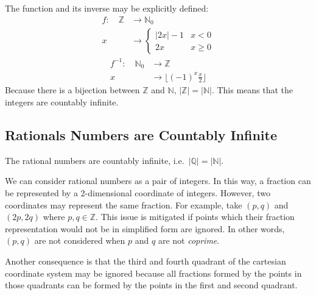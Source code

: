 The function and its inverse may be explicitly defined:
\begin{align*}
    f:\quad\mathbb{Z}&\longrightarrow\mathbb{N}_0 \\
                    x&\longrightarrow\begin{cases}
                        |2x|-1 & x<0 \\ 2x & x\ge0
                    \end{cases}
\end{align*}
\begin{align*}
    f^{-1}:\quad\mathbb{N}_0&\longrightarrow\mathbb{Z} \\
                           x&\longrightarrow\lfloor(-1)^{x}\frac{x}{2}\rfloor
\end{align*}
Because there is a bijection between \(\mathbb{Z}\) and \(\mathbb{N}\), \(|\mathbb{Z}|=|\mathbb{N}|\).
This means that the integers are countably infinite. 

\subsection{Rationals Numbers are Countably Infinite}

\begin{proposition}
    The rational numbers are countably infinite, i.e.\ \(|\mathbb{Q}|=|\mathbb{N}|\).
\end{proposition}

We can consider rational numbers as a pair of integers. In this way, a fraction can be represented by
a 2-dimensional coordinate of integers. However, two coordinates may represent the same fraction. For
example, take \((p,q)\) and \((2p,2q)\) where \(p,q\in\mathbb{Z}\). This issue is mitigated if points
which their fraction representation would not be in simplified form are ignored. In other words, \((p,q)\)
are not considered when \(p\) and \(q\) are not \emph{coprime}. 

Another consequence is that the third and fourth quadrant of the cartesian coordinate system may be ignored
because all fractions formed by the points in those quadrants can be formed by the points in the first and second
quadrant.

